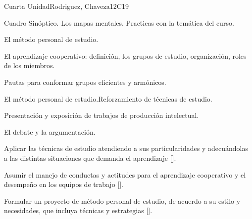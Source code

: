 \begin{syllabus}
\begin{unit}{}{Cuarta Unidad}{Rodriguez, Chaveza}{12}{C19}
\begin{topics}
        \item Cuadro Sinóptico. Los mapas mentales. Practicas con la temática del curso.
        \item El método personal de estudio.
        \item El aprendizaje cooperativo: definición, los grupos de estudio, organización, roles de los miembros.
        \item Pautas para conformar grupos eficientes y armónicos.
        \item El método personal de estudio.Reforzamiento de técnicas de estudio.
        \item Presentación y exposición de trabajos de producción intelectual.
        \item El debate y la argumentación.
\end{topics}
\begin{learningoutcomes}
        \item Aplicar las técnicas de estudio atendiendo a sus particularidades y adecuándolas a las distintas situaciones que demanda el aprendizaje [\Usage].
        \item Asumir el manejo de conductas y actitudes para el aprendizaje cooperativo y el desempeño en los equipos de trabajo [\Usage].
        \item Formular un proyecto de método personal de estudio, de acuerdo a su estilo y necesidades, que incluya técnicas y estrategias [\Usage].
\end{learningoutcomes}
\end{unit}

\begin{coursebibliography}
\end{coursebibliography}

\end{syllabus}
